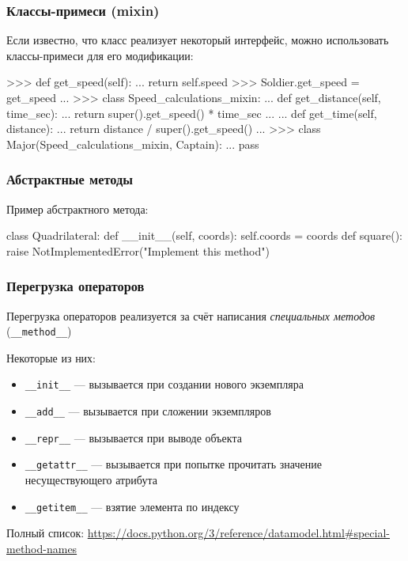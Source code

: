 \documentclass[fleqn, xcolor=x11names, 11pt]{beamer}
\begin{document}
\begin{frame}[fragile]\frametitle{Классы-примеси (mixin)}

    Если известно, что класс реализует некоторый интерфейс, можно использовать классы-примеси для его модификации: 
    
\begin{pcode}
    >>> def get_speed(self):
    ...     return self.speed
    >>> Soldier.get_speed = get_speed
    ...
    >>> class Speed_calculations_mixin:
    ...    def get_distance(self, time_sec):
    ...        return super().get_speed() * time_sec
    ...    
    ...    def get_time(self, distance):
    ...        return distance / super().get_speed()
    ...
    >>> class Major(Speed_calculations_mixin, Captain):
    ...    pass        
    \end{pcode}
\end{frame}

\begin{frame}[fragile]\frametitle{Абстрактные методы}

Пример абстрактного метода:

\begin{pcode}
class Quadrilateral:
    def __init__(self, coords):
        self.coords = coords
    def square():
        raise NotImplementedError("Implement this method")     
\end{pcode}
\end{frame}


\begin{frame}[fragile]\frametitle{Перегрузка операторов}

Перегрузка операторов реализуется за счёт написания \textit{специальных методов} (\texttt{__method__})

\hfill

Некоторые из них:

\begin{itemize}
\item \texttt{__init__} --- вызывается при создании нового экземпляра

\item \texttt{__add__} --- вызывается при сложении экземпляров

\item \texttt{__repr__} --- вызывается при выводе объекта

\item \texttt{__getattr__} --- вызывается при попытке прочитать
значение несуществующего атрибута

\item \texttt{__getitem__} --- взятие элемента по индексу

\end{itemize}

Полный список:
\href{https://docs.python.org/3/reference/datamodel.html\#special-method-names}{https://docs.python.org/3/reference/datamodel.html\#special-method-names}
\end{frame}
\end{document}
